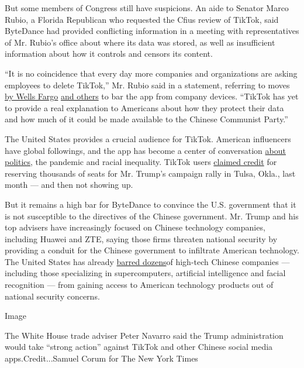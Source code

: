 But some members of Congress still have suspicions. An aide to Senator
Marco Rubio, a Florida Republican who requested the Cfius review of
TikTok, said ByteDance had provided conflicting information in a meeting
with representatives of Mr. Rubio's office about where its data was
stored, as well as insufficient information about how it controls and
censors its content.

``It is no coincidence that every day more companies and organizations
are asking employees to delete TikTok,'' Mr. Rubio said in a statement,
referring to moves
\href{https://www.cnn.com/2020/07/13/tech/tiktok-wells-fargo/index.html}{by
Wells Fargo}
\href{https://www.nytimes.com/2020/07/10/technology/tiktok-amazon-security-risk.html}{and
others} to bar the app from company devices. ``TikTok has yet to provide
a real explanation to Americans about how they protect their data and
how much of it could be made available to the Chinese Communist Party.''

The United States provides a crucial audience for TikTok. American
influencers have global followings, and the app has become a center of
conversation
\href{https://www.nytimes.com/2020/02/27/style/tiktok-politics-bernie-trump.html}{about
politics}, the pandemic and racial inequality. TikTok users
\href{https://www.nytimes.com/2020/06/21/style/tiktok-trump-rally-tulsa.html}{claimed
credit} for reserving thousands of seats for Mr. Trump's campaign rally
in Tulsa, Okla., last month --- and then not showing up.

But it remains a high bar for ByteDance to convince the U.S. government
that it is not susceptible to the directives of the Chinese government.
Mr. Trump and his top advisers have increasingly focused on Chinese
technology companies, including Huawei and ZTE, saying those firms
threaten national security by providing a conduit for the Chinese
government to infiltrate American technology. The United States has
already
\href{https://www.nytimes.com/2019/10/23/business/trump-technology-china-trade.html}{barred
dozens}of high-tech Chinese companies --- including those specializing
in supercomputers, artificial intelligence and facial recognition ---
from gaining access to American technology products out of national
security concerns.

Image

The White House trade adviser Peter Navarro said the Trump
administration would take ``strong action'' against TikTok and other
Chinese social media apps.Credit...Samuel Corum for The New York Times

